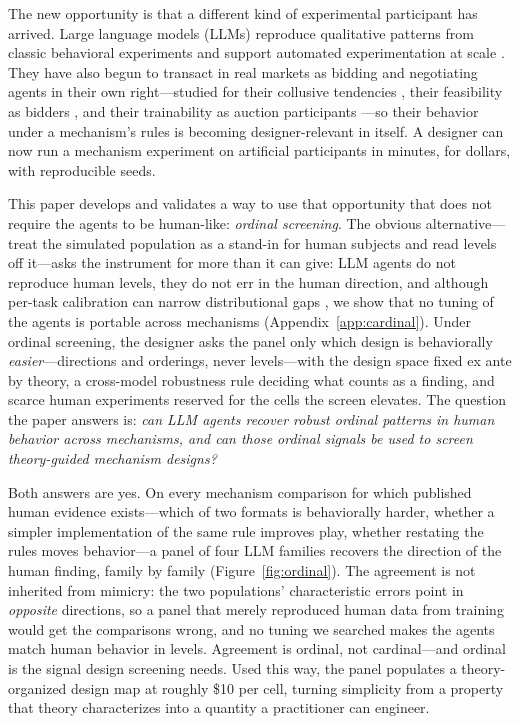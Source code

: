 The new opportunity is that a different kind of experimental participant has arrived. Large language models (LLMs) reproduce qualitative patterns from classic behavioral experiments \citep{horton2023large, aher2023using} and support automated experimentation at scale \citep{park2023generative, manning2024automated}. They have also begun to transact in real markets as bidding and negotiating agents in their own right---studied for their collusive tendencies \citep{fish2024algorithmic}, their feasibility as bidders \citep{tsuchihashi2023homo, lu2025claude}, and their trainability as auction participants \citep{chen2023put}---so their behavior under a mechanism's rules is becoming designer-relevant in itself. A designer can now run a mechanism experiment on artificial participants in minutes, for dollars, with reproducible seeds.

This paper develops and validates a way to use that opportunity that does not require the agents to be human-like: \emph{ordinal screening}. The obvious alternative---treat the simulated population as a stand-in for human subjects and read levels off it---asks the instrument for more than it can give: LLM agents do not reproduce human levels, they do not err in the human direction, and although per-task calibration can narrow distributional gaps \citep{corrigan2025usefulness}, we show that no tuning of the agents is portable across mechanisms (Appendix~\ref{app:cardinal}). Under ordinal screening, the designer asks the panel only which design is behaviorally \emph{easier}---directions and orderings, never levels---with the design space fixed ex ante by theory, a cross-model robustness rule deciding what counts as a finding, and scarce human experiments reserved for the cells the screen elevates. The question the paper answers is: \emph{can LLM agents recover robust ordinal patterns in human behavior across mechanisms, and can those ordinal signals be used to screen theory-guided mechanism designs?}

Both answers are yes. On every mechanism comparison for which published human evidence exists---which of two formats is behaviorally harder, whether a simpler implementation of the same rule improves play, whether restating the rules moves behavior---a panel of four LLM families recovers the direction of the human finding, family by family (Figure~\ref{fig:ordinal}). The agreement is not inherited from mimicry: the two populations' characteristic errors point in \emph{opposite} directions, so a panel that merely reproduced human data from training would get the comparisons wrong, and no tuning we searched makes the agents match human behavior in levels. Agreement is ordinal, not cardinal---and ordinal is the signal design screening needs. Used this way, the panel populates a theory-organized design map at roughly \$10 per cell, turning simplicity from a property that theory characterizes into a quantity a practitioner can engineer.

